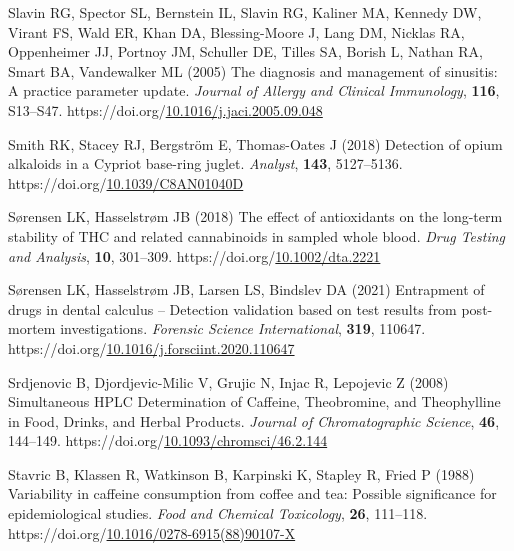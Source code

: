 \documentclass[
  11pt,
  leqno]{scrartcl}
\newlength{\cslhangindent}
\newenvironment{CSLReferences}[2] %
 {\begin{list}{}{%
  \setlength{\itemindent}{0pt}
  \setlength{\leftmargin}{0pt}
  \setlength{\parsep}{0pt}
  \ifodd #1
   \setlength{\leftmargin}{\cslhangindent}
   \setlength{\itemindent}{-1\cslhangindent}
  \fi
  \setlength{\itemsep}{#2\baselineskip}}}
 {\end{list}}
\begin{document}
\begin{CSLReferences}{1}{0}
Slavin RG, Spector SL, Bernstein IL, Slavin RG, Kaliner MA, Kennedy DW,
Virant FS, Wald ER, Khan DA, Blessing-Moore J, Lang DM, Nicklas RA,
Oppenheimer JJ, Portnoy JM, Schuller DE, Tilles SA, Borish L, Nathan RA,
Smart BA, Vandewalker ML (2005) The diagnosis and management of
sinusitis: {A} practice parameter update. \emph{Journal of Allergy and
Clinical Immunology}, \textbf{116}, S13--S47.
https://doi.org/\href{https://doi.org/10.1016/j.jaci.2005.09.048}{10.1016/j.jaci.2005.09.048}

Smith RK, Stacey RJ, Bergström E, Thomas-Oates J (2018) Detection of
opium alkaloids in a {Cypriot} base-ring juglet. \emph{Analyst},
\textbf{143}, 5127--5136.
https://doi.org/\href{https://doi.org/10.1039/C8AN01040D}{10.1039/C8AN01040D}

Sørensen LK, Hasselstrøm JB (2018) The effect of antioxidants on the
long-term stability of {THC} and related cannabinoids in sampled whole
blood. \emph{Drug Testing and Analysis}, \textbf{10}, 301--309.
https://doi.org/\href{https://doi.org/10.1002/dta.2221}{10.1002/dta.2221}

Sørensen LK, Hasselstrøm JB, Larsen LS, Bindslev DA (2021) Entrapment of
drugs in dental calculus -- {Detection} validation based on test results
from post-mortem investigations. \emph{Forensic Science International},
\textbf{319}, 110647.
https://doi.org/\href{https://doi.org/10.1016/j.forsciint.2020.110647}{10.1016/j.forsciint.2020.110647}

Srdjenovic B, Djordjevic-Milic V, Grujic N, Injac R, Lepojevic Z (2008)
Simultaneous {HPLC Determination} of {Caffeine}, {Theobromine}, and
{Theophylline} in {Food}, {Drinks}, and {Herbal Products}. \emph{Journal
of Chromatographic Science}, \textbf{46}, 144--149.
https://doi.org/\href{https://doi.org/10.1093/chromsci/46.2.144}{10.1093/chromsci/46.2.144}

Stavric B, Klassen R, Watkinson B, Karpinski K, Stapley R, Fried P
(1988) Variability in caffeine consumption from coffee and tea:
{Possible} significance for epidemiological studies. \emph{Food and
Chemical Toxicology}, \textbf{26}, 111--118.
https://doi.org/\href{https://doi.org/10.1016/0278-6915(88)90107-X}{10.1016/0278-6915(88)90107-X}


\end{CSLReferences}
\end{document}
